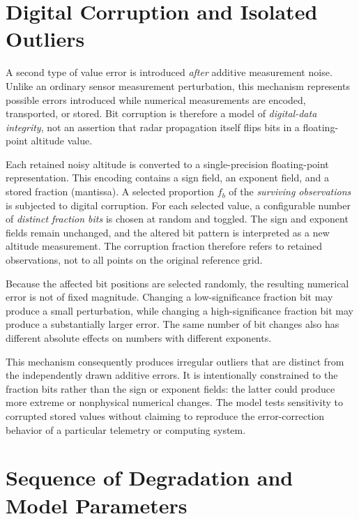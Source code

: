 \section{Digital Corruption and Isolated Outliers}
\label{sec:noise-bit-errors}

A second type of value error is introduced \emph{after}
additive measurement noise. Unlike an ordinary sensor
measurement perturbation, this mechanism represents
possible errors introduced while numerical measurements
are encoded, transported, or stored. Bit corruption is
therefore a model of \emph{digital-data integrity},
not an assertion that radar propagation itself flips
bits in a floating-point altitude value.

Each retained noisy altitude is converted to a
single-precision floating-point representation.
This encoding contains a sign field, an exponent
field, and a stored fraction (mantissa).
A selected proportion $f_b$ of the \emph{surviving
observations} is subjected to digital corruption.
For each selected value, a configurable number
of \emph{distinct fraction bits} is chosen at random
and toggled. The sign and exponent fields remain
unchanged, and the altered bit pattern is interpreted
as a new altitude measurement. The corruption
fraction therefore refers to retained observations,
not to all points on the original reference grid.

Because the affected bit positions are selected
randomly, the resulting numerical error is not
of fixed magnitude. Changing a low-significance fraction
bit may produce a small perturbation, while changing
a high-significance fraction bit may produce a
substantially larger error. The same number of
bit changes also has different absolute effects
on numbers with different exponents.

This mechanism consequently produces irregular
outliers that are distinct from the independently
drawn additive errors. It is intentionally
constrained to the fraction bits rather than the
sign or exponent fields: the latter could produce
more extreme or nonphysical numerical changes.
The model tests sensitivity to corrupted stored
values without claiming to reproduce the
error-correction behavior of a particular
telemetry or computing system.

\section{Sequence of Degradation and Model Parameters}
\label{sec:noise-sequence}

